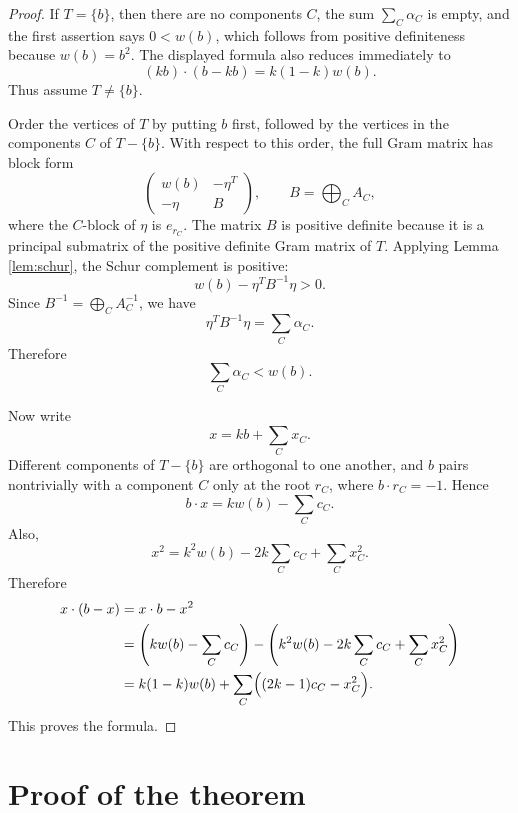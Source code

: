 \documentclass[12pt]{article}
\begin{document}
\begin{proof}
If \(T=\{b\}\), then there are no components \(C\), the sum \(\sum_C\alpha_C\) is empty, and the first assertion says \(0<w(b)\), which follows from positive definiteness because \(w(b)=b^2\). The displayed formula also reduces immediately to
\[
(kb)\cdot(b-kb)=k(1-k)w(b).
\]
Thus assume \(T\ne \{b\}\).

Order the vertices of \(T\) by putting \(b\) first, followed by the vertices in the components \(C\) of \(T-\{b\}\). With respect to this order, the full Gram matrix has block form
\[
\begin{pmatrix}
w(b) & -\eta^T\\
-\eta & B
\end{pmatrix},
\qquad
B=\bigoplus_C A_C,
\]
where the \(C\)-block of \(\eta\) is \(e_{r_C}\). The matrix \(B\) is positive definite because it is a principal submatrix of the positive definite Gram matrix of \(T\). Applying Lemma \ref{lem:schur}, the Schur complement is positive:
\[
w(b)-\eta^TB^{-1}\eta>0.
\]
Since \(B^{-1}=\bigoplus_C A_C^{-1}\), we have
\[
\eta^TB^{-1}\eta=\sum_C \alpha_C.
\]
Therefore
\[
\sum_C\alpha_C<w(b).
\]

Now write
\[
x=kb+\sum_C x_C.
\]
Different components of \(T-\{b\}\) are orthogonal to one another, and \(b\) pairs nontrivially with a component \(C\) only at the root \(r_C\), where \(b\cdot r_C=-1\). Hence
\[
b\cdot x=kw(b)-\sum_C c_C.
\]
Also,
\[
x^2
=
k^2w(b)-2k\sum_C c_C+\sum_C x_C^2.
\]
Therefore
\[
\begin{aligned}
x\cdot(b-x)
&=x\cdot b-x^2\\
&=
\left(kw(b)-\sum_C c_C\right)
-
\left(k^2w(b)-2k\sum_C c_C+\sum_C x_C^2\right)\\
&=
k(1-k)w(b)
+
\sum_C\Bigl((2k-1)c_C-x_C^2\Bigr).
\end{aligned}
\]
This proves the formula.
\end{proof}

\section*{Proof of the theorem}
\end{document}
